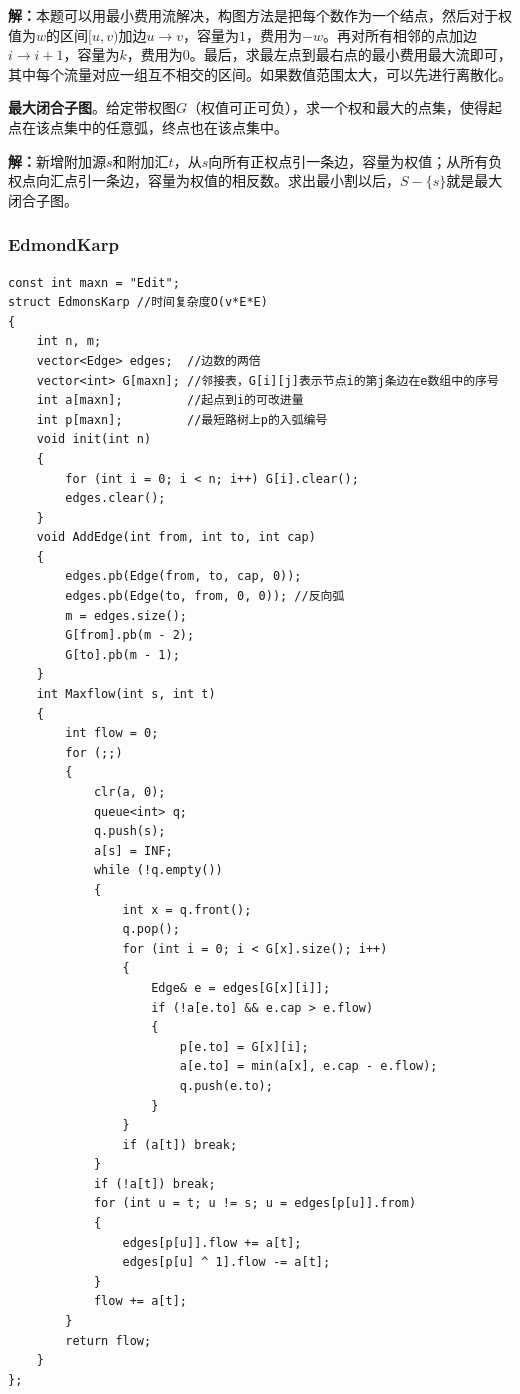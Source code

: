 \documentclass[twoside]{article}
\begin{document}
\indent

\textbf{解：}本题可以用最小费用流解决，构图方法是把每个数作为一个结点，然后对于权值为$w$的区间$[u,v)$加边$u→v$，容量为$1$，费用为$-w$。再对所有相邻的点加边$i→i+1$，容量为$k$，费用为$0$。最后，求最左点到最右点的最小费用最大流即可，其中每个流量对应一组互不相交的区间。如果数值范围太大，可以先进行离散化。

\indent

\textbf{最大闭合子图}。给定带权图$G$（权值可正可负），求一个权和最大的点集，使得起点在该点集中的任意弧，终点也在该点集中。

\indent

\textbf{解：}新增附加源$s$和附加汇$t$，从$s$向所有正权点引一条边，容量为权值；从所有负权点向汇点引一条边，容量为权值的相反数。求出最小割以后，$S - \lbrace s \rbrace$就是最大闭合子图。
\subsubsection{EdmondKarp}
\begin{lstlisting}
const int maxn = "Edit";
struct EdmonsKarp //时间复杂度O(v*E*E)
{
    int n, m;
    vector<Edge> edges;  //边数的两倍
    vector<int> G[maxn]; //邻接表，G[i][j]表示节点i的第j条边在e数组中的序号
    int a[maxn];         //起点到i的可改进量
    int p[maxn];         //最短路树上p的入弧编号
    void init(int n)
    {
        for (int i = 0; i < n; i++) G[i].clear();
        edges.clear();
    }
    void AddEdge(int from, int to, int cap)
    {
        edges.pb(Edge(from, to, cap, 0));
        edges.pb(Edge(to, from, 0, 0)); //反向弧
        m = edges.size();
        G[from].pb(m - 2);
        G[to].pb(m - 1);
    }
    int Maxflow(int s, int t)
    {
        int flow = 0;
        for (;;)
        {
            clr(a, 0);
            queue<int> q;
            q.push(s);
            a[s] = INF;
            while (!q.empty())
            {
                int x = q.front();
                q.pop();
                for (int i = 0; i < G[x].size(); i++)
                {
                    Edge& e = edges[G[x][i]];
                    if (!a[e.to] && e.cap > e.flow)
                    {
                        p[e.to] = G[x][i];
                        a[e.to] = min(a[x], e.cap - e.flow);
                        q.push(e.to);
                    }
                }
                if (a[t]) break;
            }
            if (!a[t]) break;
            for (int u = t; u != s; u = edges[p[u]].from)
            {
                edges[p[u]].flow += a[t];
                edges[p[u] ^ 1].flow -= a[t];
            }
            flow += a[t];
        }
        return flow;
    }
};
\end{lstlisting}
\end{document}
